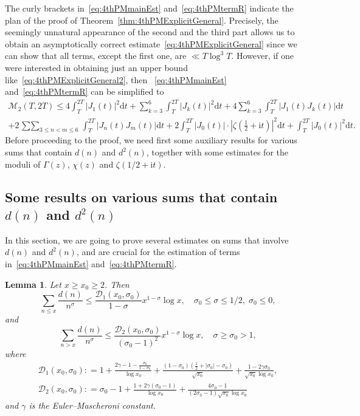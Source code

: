 \documentclass[a4paper,reqno]{amsart}
\newtheorem{lemma}[theorem]{Lemma}
\theoremstyle{definition}
\newcommand{\de}[0]{\mathrel{\mathop:}=}
\newcommand{\ie}[0]{\mathrm{i}}
\newcommand{\dif}[1]{\mathrm{d}#1}
\begin{document}
The curly brackets in~\eqref{eq:4thPMmainEst} and~\eqref{eq:4thPMtermR} indicate the plan of the proof of Theorem~\ref{thm:4thPMExplicitGeneral}. Precisely, the seemingly unnatural appearance of the second and the third part allows us to obtain an asymptotically correct estimate~\eqref{eq:4thPMExplicitGeneral} since we can show that all terms, except the first one, are $\ll T\log^{3}{T}$. However, if one were interested in obtaining just an upper bound like~\eqref{eq:4thPMExplicitGeneral2}, then ~\eqref{eq:4thPMmainEst} and~\eqref{eq:4thPMtermR} can be simplified to
\begin{multline}
\label{eq:4thPMmainEst2}
\mathcal{M}_{2}(T,2T) \leq 4\int_{T}^{2T}\left|J_1(t)\right|^{2}\dif{t} + \sum_{k=3}^{6}\int_{T}^{2T}\left|J_k(t)\right|^{2}\dif{t} + 4\sum_{k=3}^{6}\int_{T}^{2T}\left|J_1(t)J_{k}(t)\right|\dif{t} \\
+ 2\mathop{\sum\sum}_{3\leq n<m\leq 6}\int_{T}^{2T}\left|J_{n}(t)J_{m}(t)\right|\dif{t}
+ 2\int_{T}^{2T}\left|J_0(t)\right|\cdot\left|\zeta\left(\frac{1}{2}+\ie t\right)\right|^{2}\dif{t} + \int_{T}^{2T}\left|J_0(t)\right|^{2}\dif{t}.
\end{multline}
Before proceeding to the proof, we need first some auxiliary results for various sums that contain $d(n)$ and $d^{2}(n)$, together with some estimates for the moduli of $\Gamma(z)$, $\chi(z)$ and $\zeta(1/2+\ie t)$.

\subsection{Some results on various sums that contain \texorpdfstring{$d(n)$}{d(n)} and \texorpdfstring{$d^{2}(n)$}{d2(n)}}
\label{subsec:divisorSums}

In this section, we are going to prove several estimates on sums that involve $d(n)$ and $d^{2}(n)$, and are crucial for the estimation of terms in~\eqref{eq:4thPMmainEst} and~\eqref{eq:4thPMtermR}.

\begin{lemma}
\label{lem:d}
Let $x\geq x_0\geq 2$. Then
\[
\sum_{n\leq x}\frac{d(n)}{n^\sigma} \leq \frac{\mathcal{D}_1(x_0,\sigma_0)}{1-\sigma}x^{1-\sigma}\log{x}, \quad \sigma_0\leq\sigma\leq 1/2,\; \sigma_0\leq 0,
\]
and
\[
\sum_{n>x}\frac{d(n)}{n^\sigma} \leq \frac{\mathcal{D}_{2}(x_0,\sigma_0)}{(\sigma_0-1)^{2}}x^{1-\sigma}\log{x}, \quad \sigma\geq\sigma_0>1,
\]
where
\begin{gather}
\mathcal{D}_1(x_0,\sigma_0) \de 1 + \frac{2\gamma-1-\frac{\sigma_0}{1-\sigma_0}}{\log{x_0}} + \frac{(1-\sigma_0)\left(\frac{1}{2}+|\sigma_0|-\sigma_0\right)}{\sqrt{x_0}} + \frac{1-2\gamma\sigma_0}{\sqrt{x_0}\log{x_0}}, \label{eq:D1} \\ \mathcal{D}_{2}(x_0,\sigma_0)\de \sigma_0-1+\frac{1+2\gamma(\sigma_0-1)}{\log{x_0}}+\frac{4\sigma_0-1}{(2\sigma_0-1)\sqrt{x_0}\log{x_0}} \label{eq:D2}
\end{gather}
and $\gamma$ is the Euler--Mascheroni constant.
\end{lemma}
\end{document}
